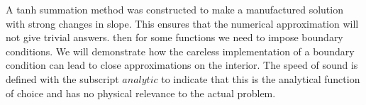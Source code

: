 %
%
%
%
%
%
%
%
%
%
%
A tanh summation method was constructed to make a manufactured solution with 
strong changes in slope. This ensures that the numerical approximation will not 
give trivial answers. 
then for some functions we need to impose boundary conditions. We will demonstrate
how the careless implementation of a boundary condition can lead to close approximations
on the interior.  The speed of sound is defined with the subscript $analytic$ to indicate that this is the analytical function of choice and has no physical relevance 
to the actual problem.

